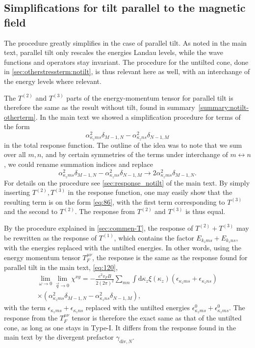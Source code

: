 \subsection{Simplifications for tilt parallel to the magnetic field}
The procedure greatly simplifies in the case of parallel tilt.
As noted in the main text, parallel tilt only rescales the energies Landau levels, while the wave functions and operators stay invariant.
The procedure for the untilted cone, done in \cref{sec:otherstressterm:notilt}, is thus relevant here as well, with an interchange of the energy levels where relevant.

The \( T^{(2)} \) and \( T^{(3)} \) parts of the energy-momentum tensor for parallel tilt is therefore the same as the result without tilt, found in summary~\ref{summary:notilt-otherterm}.
In the main text we showed a simplification procedure for terms of the form
\begin{equation}
 \label{eq:86}
  \alpha_{\kappa_z m s}^2 \delta_{M-1, N} - \alpha_{\kappa_z n s}^2 \delta_{N-1,M}
\end{equation}
in the total response function.
The outline of the idea was to note that we sum over all \( m,n \), and by certain symmetries of the terms under interchange of \( m\leftrightarrow n \), we could rename summation indices and replace
\begin{equation}
  \alpha_{\kappa_z m s}^2 \delta_{M-1, N} - \alpha_{\kappa_z n s}^2 \delta_{N-1,M}
  \to
  2 \alpha_{\kappa_z m s}^2 \delta_{M-1, N}.
\end{equation}
For details on the procedure see \cref{sec:response_notilt} of the main text.
By simply inserting \( T^{(2)}, T^{(3)} \) in the response function, one may easily show that the resulting term is on the form \cref{eq:86}, with the first term corresponding to \( T^{(3)} \) and the second to \( T^{(2)} \).
The response from \( T^{(2)} \) and \( T^{(3)} \) is thus equal.

By the procedure explained in \cref{sec:commen-T}, the response of \( T^{(2)} + T^{(3)} \) may be rewritten as the response of \( T^{(1)} \), which contains the factor \( E_{k_z m s} + E_{k_z n s} \), with the energies replaced with the untilted energies.
In other words, using the energy momentum tensor \( T^{\mu \nu}_F \), the response is the same as the response found for parallel tilt in the main text, \cref{eq:120},
\begin{multline*}
  \lim_{\omega \to 0} \lim_{\vec{q} \to 0} \chi^{xy} =
  - \frac{e^2 v_F B}{2 (2\pi)^2}
  \sum\limits_{mn} \int \mathrm{d} \kappa_z
  \xi(\kappa_z)
  (\epsilon_{\kappa_z m s} + \epsilon_{\kappa_z n s})\\
  \times(\alpha_{\kappa_z m s}^2 \delta_{M-1, N} - \alpha_{\kappa_z n s}^2 \delta_{N-1, M}),
\end{multline*}
with the term \( \epsilon_{\kappa_z m s} + \epsilon_{\kappa_z n s} \) replaced with the untilted energies \( \epsilon^0_{\kappa_z m s} + \epsilon^0_{\kappa_z m s}\).
The response from the \( T^{\mu \nu}_F \) tensor is therefore the exact same as that of the untilted cone, as long as one stays in Type-I.
It differs from the response found in the main text by the divergent prefactor \( \gamma_{\text{div}, N} \).
